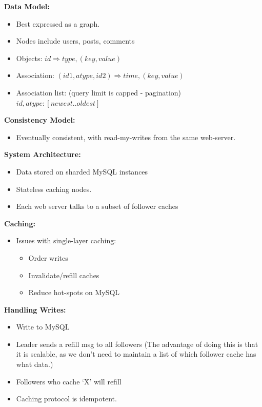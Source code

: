 \documentclass[parskip=half]{scrartcl}
\begin{document}
    \textbf{Data Model:}
    \begin{itemize}
        \item 
        Best expressed as a graph.
        \item 
        Nodes include users, posts, comments
        \item 
        Objects:
        $id \Rightarrow type, (key, value)$
        \item 
        Association:
        $(id1, atype, id2) \Rightarrow time, (key, value) $
        \item 
        Association list: (query limit is capped - pagination)
        $id, atype: [newest .. oldest]$
    \end{itemize}

    \textbf{Consistency Model:}
    \begin{itemize}
        \item 
        Eventually consistent, with read-my-writes from the same web-server.
    \end{itemize}

    \textbf{System Architecture:}
    \begin{itemize}
        \item 
        Data stored on sharded MySQL instances
        \item 
        Stateless caching nodes.
        \item 
        Each web server talks to a subset of follower caches
    \end{itemize}

    \textbf{Caching:}
    \begin{itemize}
        \item 
        Issues with single-layer caching:
        \begin{itemize}
            \item 
            Order writes
            \item 
            Invalidate/refill caches
            \item 
            Reduce hot-spots on MySQL
        \end{itemize}
    \end{itemize}

    \textbf{Handling Writes:}
    \begin{itemize}
        \item 
        Write to MySQL
        \item 
        Leader sends a refill msg to all followers (The advantage of doing this is that it is scalable, as we don't need to maintain a list of which follower cache has what data.)
        \item 
        Followers who cache `X' will refill
        \item 
        Caching protocol is idempotent.
    \end{itemize}
\end{document}
